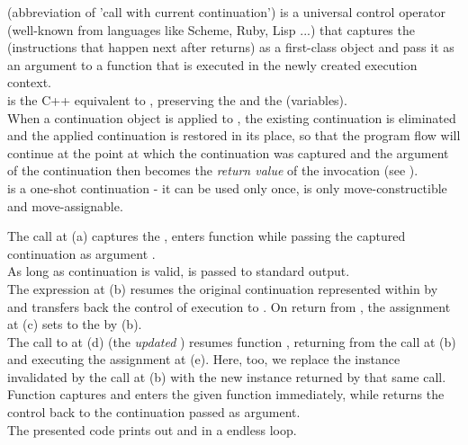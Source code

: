 
\cc (abbreviation of 'call with current continuation') is a universal control
operator (well-known from languages like Scheme, Ruby, Lisp ...) that captures
the \currcont (instructions that happen next after \cc returns) as a first-class
object and pass it as an argument to a function that is executed in the newly
created execution context.\\

\call is the C++ equivalent to \cc, preserving the  and the
 (variables).\\

When a continuation object is applied to \resume, the existing continuation is
eliminated and the applied continuation is restored in its place, so that the
program flow will continue at the point at which the continuation was captured
and the argument of the continuation then becomes the \emph{return value} of
the \call invocation (see ).\\

\cont is a one-shot continuation - it can be used only once, is only
move-constructible and move-assignable.

The  call at (a) captures the \currcont, enters function
 while passing the captured continuation as argument .\\
As long as continuation  is valid,  is passed to standard
output.\\
The expression  at (b) resumes the original
continuation represented within  by  and transfers back the
control of execution to . On return from ,
the assignment at (c) sets  to the \currcont by (b).\\
The call to  at (d) (the \emph{updated} )
resumes function , returning from the  call at (b) and
executing the assignment at (e). Here, too, we replace the \cont instance
 invalidated by the \resume call at (b) with the new instance
returned by that same \resume call.\\
Function \call captures \currcont and enters the given function immediately,
while \resume returns the control back to the continuation passed as argument.\\
The presented code prints out  and  in a endless loop.\\

